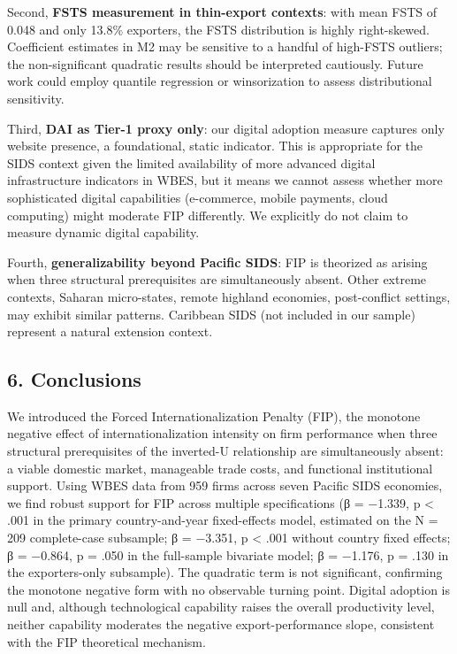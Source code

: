 \documentclass[
  12pt,a4paper]{article}
\begin{document}
Second, \textbf{FSTS measurement in thin-export contexts}: with mean
FSTS of 0.048 and only 13.8\% exporters, the FSTS distribution is highly
right-skewed. Coefficient estimates in M2 may be sensitive to a handful
of high-FSTS outliers; the non-significant quadratic results should be
interpreted cautiously. Future work could employ quantile regression or
winsorization to assess distributional sensitivity.

Third, \textbf{DAI as Tier-1 proxy only}: our digital adoption measure
captures only website presence, a foundational, static indicator. This
is appropriate for the SIDS context given the limited availability of
more advanced digital infrastructure indicators in WBES, but it means we
cannot assess whether more sophisticated digital capabilities
(e-commerce, mobile payments, cloud computing) might moderate FIP
differently. We explicitly do not claim to measure dynamic digital
capability.

Fourth, \textbf{generalizability beyond Pacific SIDS}: FIP is theorized
as arising when three structural prerequisites are simultaneously
absent. Other extreme contexts, Saharan micro-states, remote highland
economies, post-conflict settings, may exhibit similar patterns.
Caribbean SIDS (not included in our sample) represent a natural
extension context.

\hypertarget{conclusions}{%
\subsection{6. Conclusions}\label{conclusions}}

We introduced the Forced Internationalization Penalty (FIP), the
monotone negative effect of internationalization intensity on firm
performance when three structural prerequisites of the inverted-U
relationship are simultaneously absent: a viable domestic market,
manageable trade costs, and functional institutional support. Using WBES
data from 959 firms across seven Pacific SIDS economies, we find robust
support for FIP across multiple specifications (β = −1.339, p
\textless{} .001 in the primary country-and-year fixed-effects model,
estimated on the N = 209 complete-case subsample; β = −3.351, p
\textless{} .001 without country fixed effects; β = −0.864, p = .050 in
the full-sample bivariate model; β = −1.176, p = .130 in the
exporters-only subsample). The quadratic term is not significant,
confirming the monotone negative form with no observable turning point.
Digital adoption is null and, although technological capability raises
the overall productivity level, neither capability moderates the
negative export-performance slope, consistent with the FIP theoretical
mechanism.
\end{document}
